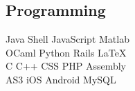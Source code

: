 \documentclass[letterpaper]{deedy-resume-modified} %
\begin{document}
\begin{minipage}[t]{0.33\textwidth}
\subsection{Programming}

Java \textbullet{} Shell \textbullet{} JavaScript \textbullet{} Matlab \\
OCaml \textbullet{} Python \textbullet{} Rails \textbullet{} \LaTeX\ \\ 
C \textbullet{} C++ \textbullet{} CSS \textbullet{} PHP \textbullet{} Assembly \\
AS3 \textbullet{} iOS \textbullet{} Android \textbullet{} MySQL

\sectionspace %


\end{minipage} %
\hfill
%
%
\end{document}
